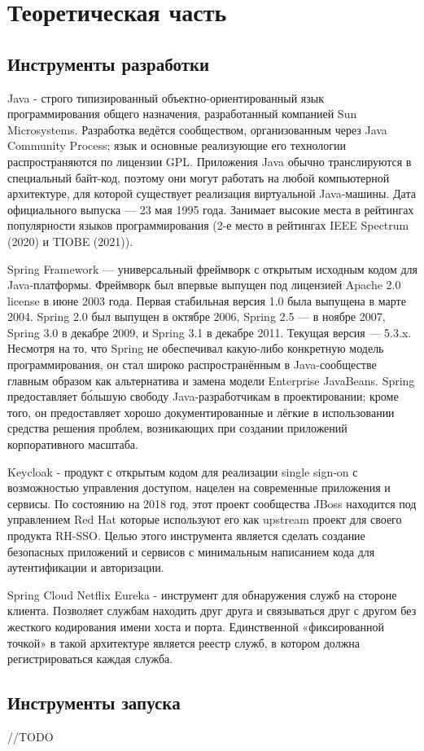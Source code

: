 \section{Теоретическая часть}

\subsection{Инструменты разработки}
    Java - строго типизированный объектно-ориентированный язык программирования общего назначения, разработанный компанией Sun Microsystems. Разработка ведётся сообществом, организованным через Java Community Process; язык и основные реализующие его технологии распространяются по лицензии GPL. Приложения Java обычно транслируются в специальный байт-код, поэтому они могут работать на любой компьютерной архитектуре, для которой существует реализация виртуальной Java-машины. Дата официального выпуска — 23 мая 1995 года. Занимает высокие места в рейтингах популярности языков программирования (2-е место в рейтингах IEEE Spectrum (2020) и TIOBE (2021)).

    Spring Framework — универсальный фреймворк с открытым исходным кодом для Java-платформы. Фреймворк был впервые выпущен под лицензией Apache 2.0 license в июне 2003 года. Первая стабильная версия 1.0 была выпущена в марте 2004. Spring 2.0 был выпущен в октябре 2006, Spring 2.5 — в ноябре 2007, Spring 3.0 в декабре 2009, и Spring 3.1 в декабре 2011. Текущая версия — 5.3.x. Несмотря на то, что Spring не обеспечивал какую-либо конкретную модель программирования, он стал широко распространённым в Java-сообществе главным образом как альтернатива и замена модели Enterprise JavaBeans. Spring предоставляет бо́льшую свободу Java-разработчикам в проектировании; кроме того, он предоставляет хорошо документированные и лёгкие в использовании средства решения проблем, возникающих при создании приложений корпоративного масштаба.
    
    Keycloak - продукт с открытым кодом для реализации single sign-on с возможностью управления доступом, нацелен на современные приложения и сервисы. По состоянию на 2018 год, этот проект сообщества JBoss находится под управлением Red Hat которые используют его как upstream проект для своего продукта RH-SSO. Целью этого инструмента является сделать создание безопасных приложений и сервисов с минимальным написанием кода для аутентификации и авторизации. 

    Spring Cloud Netflix Eureka - инструмент для обнаружения служб на стороне клиента. Позволяет службам находить друг друга и связываться друг с другом без жесткого кодирования имени хоста и порта. Единственной «фиксированной точкой» в такой архитектуре является реестр служб, в котором должна регистрироваться каждая служба.

\subsection{Инструменты запуска}
    //TODO 
    
        
\clearpage